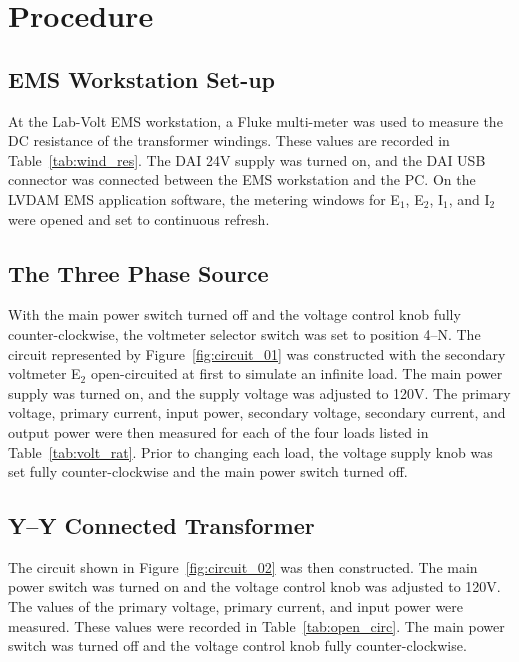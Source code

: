\documentclass{article}
\begin{document}
\section{Procedure}

\subsection{EMS Workstation Set-up}

At the Lab-Volt EMS workstation, a Fluke multi-meter was used to measure the DC
resistance of the transformer windings. These values are recorded in
Table~\ref{tab:wind_res}.  The DAI 24V supply was turned on, and the DAI USB
connector was connected between the EMS workstation and the {PC}. On the LVDAM
EMS application software, the metering windows for E$_1$, E$_2$, I$_1$, and
I$_2$ were opened and set to continuous refresh.

\subsection{The Three Phase Source}

\label{part1} With the main power switch turned off and the voltage control
knob fully counter-clockwise, the voltmeter selector switch was set to position
4--N. The circuit represented by Figure~\ref{fig:circuit_01} was constructed
with the secondary voltmeter E$_2$ open-circuited at first to simulate an
infinite load.  The main power supply was turned on, and the supply voltage was
adjusted to 120V. The primary voltage, primary current, input power, secondary
voltage, secondary current, and output power were then measured for each of the
four loads listed in Table~\ref{tab:volt_rat}.  Prior to changing each load,
the voltage supply knob was set fully counter-clockwise and the main power
switch turned off.

\subsection{Y--Y Connected Transformer}

\label{part2} The circuit shown in Figure~\ref{fig:circuit_02} was then
constructed. The main power switch was turned on and the voltage control knob
was adjusted to 120V. The values of the primary voltage, primary current, and
input power were measured. These values were recorded in
Table~\ref{tab:open_circ}.  The main power switch was turned off and the
voltage control knob fully counter-clockwise.
\end{document}
